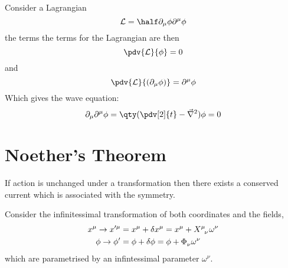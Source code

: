 \begin{example}
  Consider a Lagrangian
  \[ \Lag = \half \partial_{\mu} \phi \partial^{\mu} \phi \] the terms
  the terms for the Lagrangian are then
  \[ \pdv{\Lag}{\phi} = 0 \] and \[ \pdv{\Lag}{(\partial_{\mu} \phi)}
  = \partial^{\mu} \phi \] Which gives the wave equation:
  \[ \partial_{\mu} \partial^{\mu} \phi = \qty( \pdv[2]{t} -
  \vec{\nabla}^2 ) \phi = 0 \]
\end{example}

\section{Noether's Theorem}
\label{sec:noethers-theorem}

\begin{theorem}
  If action is unchanged under a transformation then there exists a
  conserved current which is associated with the symmetry.
\end{theorem}

Consider the infinitessimal transformation of both coordinates and the
fields,
\begin{align*}
  x^{\mu} \to x^{\prime \mu} &= x^{\mu} + \delta x^{\mu} = x^{\mu} + \tensor{X}{^\mu_\nu} \omega^{\nu} 
  \\ \phi \to \phi^{\prime} &= \phi + \delta \phi = \phi + \tensor{\Phi}{_{\nu}} \omega^{\nu}
\end{align*}
which are parametrised by an infintessimal parameter $\omega^{\nu}$.

